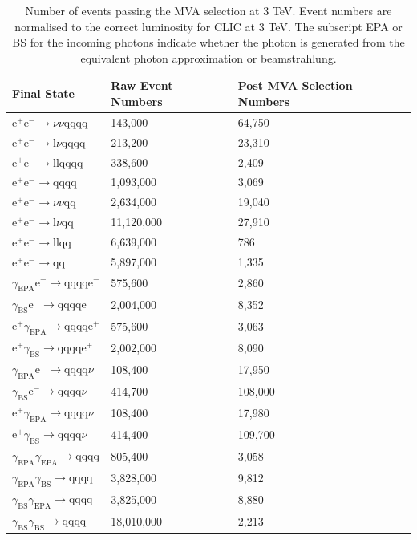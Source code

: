 \begin{table}[h!]
\centering
\begin{tabular}{ l l l}
\hline
Final State & Raw Event Numbers & Post MVA Selection Numbers \\ 
\hline
$\text{e}^{+}\text{e}^{-} \rightarrow \nu{\nu}\text{qqqq}$ & 143,000 & 64,750 \\
$\text{e}^{+}\text{e}^{-} \rightarrow \text{l}\nu\text{qqqq}$ & 213,200 & 23,310 \\
$\text{e}^{+}\text{e}^{-} \rightarrow \text{llqqqq}$ & 338,600 & 2,409 \\
$\text{e}^{+}\text{e}^{-} \rightarrow \text{qqqq}$ & 1,093,000 & 3,069 \\
$\text{e}^{+}\text{e}^{-} \rightarrow \nu{\nu}\text{qq}$ & 2,634,000 & 19,040 \\
$\text{e}^{+}\text{e}^{-} \rightarrow \text{l}\nu\text{qq}$ & 11,120,000 & 27,910 \\
$\text{e}^{+}\text{e}^{-} \rightarrow \text{llqq}$ & 6,639,000 & 786 \\
$\text{e}^{+}\text{e}^{-} \rightarrow \text{qq}$ & 5,897,000 & 1,335 \\
$\gamma_{\text{EPA}}\text{e}^{-} \rightarrow \text{qqqq}\text{e}^{-}$ & 575,600 & 2,860 \\
$\gamma_{\text{BS}}\text{e}^{-} \rightarrow \text{qqqq}\text{e}^{-}$ & 2,004,000 & 8,352 \\
$\text{e}^{+}\gamma_{\text{EPA}} \rightarrow \text{qqqq}\text{e}^{+}$ & 575,600 & 3,063 \\
$\text{e}^{+}\gamma_{\text{BS}} \rightarrow \text{qqqq}\text{e}^{+}$ & 2,002,000 & 8,090 \\
$\gamma_{\text{EPA}}\text{e}^{-} \rightarrow \text{qqqq}\nu$ & 108,400 & 17,950 \\
$\gamma_{\text{BS}}\text{e}^{-} \rightarrow \text{qqqq}\nu$ & 414,700 & 108,000 \\
$\text{e}^{+}\gamma_{\text{EPA}} \rightarrow \text{qqqq}\nu$ & 108,400 & 17,980 \\
$\text{e}^{+}\gamma_{\text{BS}} \rightarrow \text{qqqq}\nu$ & 414,400 & 109,700 \\
$\gamma_{\text{EPA}}\gamma_{\text{EPA}} \rightarrow \text{qqqq}$ & 805,400 & 3,058 \\
$\gamma_{\text{EPA}}\gamma_{\text{BS}} \rightarrow \text{qqqq}$ & 3,828,000 & 9,812 \\
$\gamma_{\text{BS}}\gamma_{\text{EPA}} \rightarrow \text{qqqq}$ & 3,825,000 & 8,880 \\
$\gamma_{\text{BS}}\gamma_{\text{BS}} \rightarrow \text{qqqq}$ & 18,010,000 & 2,213 \\
\hline
\end{tabular}
\caption[Number of events passing the MVA selection at 3 TeV.]{Number of events passing the MVA selection at 3 TeV.  Event numbers are normalised to the correct luminosity for CLIC at 3 TeV.   The subscript EPA or BS for the incoming photons indicate whether the photon is generated from the equivalent photon approximation or beamstrahlung.}
\label{table:postmvanumbers3000GeV}
\end{table}

